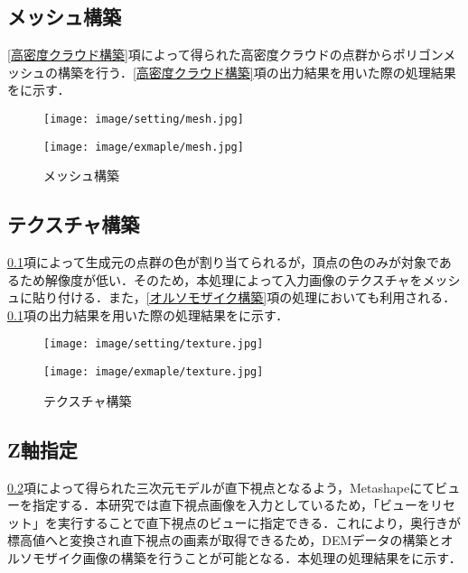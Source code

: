     \subsection{メッシュ構築}
      \label{メッシュ構築}
      \ref{高密度クラウド構築}項によって得られた高密度クラウドの点群からポリゴンメッシュの構築を行う．\ref{高密度クラウド構築}項の出力結果を用いた際の処理結果をに示す．

      \begin{figure}[t]
        \begin{minipage}[c]{0.45\hsize}
          \centering
          \texttt{[image: image/setting/mesh.jpg]}
        \end{minipage}
        \begin{minipage}[c]{0.45\hsize}
          \centering
          \texttt{[image: image/exmaple/mesh.jpg]}
        \end{minipage}
        \caption{メッシュ構築}
        \label{メッシュ構築結果}
      \end{figure}


    \subsection{テクスチャ構築}
      \label{テクスチャ構築}
      \ref{メッシュ構築}項によって生成元の点群の色が割り当てられるが，頂点の色のみが対象であるため解像度が低い．そのため，本処理によって入力画像のテクスチャをメッシュに貼り付ける．また，\ref{オルソモザイク構築}項の処理においても利用される．\ref{メッシュ構築}項の出力結果を用いた際の処理結果をに示す．

      \begin{figure}[t]
        \begin{minipage}[c]{0.45\hsize}
          \centering
          \texttt{[image: image/setting/texture.jpg]}
        \end{minipage}
        \begin{minipage}[c]{0.45\hsize}
          \centering
          \texttt{[image: image/exmaple/texture.jpg]}
        \end{minipage}
        \caption{テクスチャ構築}
        \label{テクスチャ構築結果}
      \end{figure}


    \subsection{Z軸指定}
      \label{Z軸指定}
      \ref{テクスチャ構築}項によって得られた三次元モデルが直下視点となるよう，Metashapeにてビューを指定する．本研究では直下視点画像を入力としているため，「ビューをリセット」を実行することで直下視点のビューに指定できる．これにより，奥行きが標高値へと変換され直下視点の画素が取得できるため，DEMデータの構築とオルソモザイク画像の構築を行うことが可能となる．本処理の処理結果をに示す．

